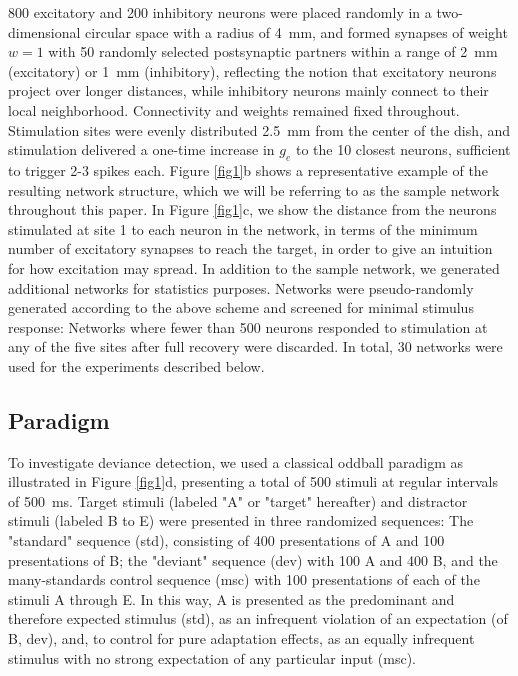 \documentclass[pdflatex,referee,iicol,sn-basic]{sn-jnl}
\theoremstyle{thmstyleone}%
\theoremstyle{thmstyletwo}%
\theoremstyle{thmstylethree}%
\begin{document}
800 excitatory and 200 inhibitory neurons were placed randomly in a two-dimensional circular space with a radius of 4~mm, and formed synapses of weight $w = 1$ with 50 randomly selected postsynaptic partners within a range of 2~mm (excitatory) or 1~mm (inhibitory), reflecting the notion that excitatory neurons project over longer distances, while inhibitory neurons mainly connect to their local neighborhood. Connectivity and weights remained fixed throughout. Stimulation sites were evenly distributed 2.5~mm from the center of the dish, and stimulation delivered a one-time increase in $g_e$ to the 10 closest neurons, sufficient to trigger 2-3 spikes each. Figure \ref{fig1}b shows a representative example of the resulting network structure, which we will be referring to as the sample network throughout this paper. In Figure \ref{fig1}c, we show the distance from the neurons stimulated at site 1 to each neuron in the network, in terms of the minimum number of excitatory synapses to reach the target, in order to give an intuition for how excitation may spread. In addition to the sample network, we generated additional networks for statistics purposes. Networks were pseudo-randomly generated according to the above scheme and screened for minimal stimulus response: Networks where fewer than 500 neurons responded to stimulation at any of the five sites after full recovery were discarded. In total, 30 networks were used for the experiments described below.

\subsection{Paradigm}\label{sec-paradigm}

To investigate deviance detection, we used a classical oddball paradigm as illustrated in Figure \ref{fig1}d, presenting a total of 500 stimuli at regular intervals of 500~ms. Target stimuli (labeled "A" or "target" hereafter) and distractor stimuli (labeled B to E) were presented in three randomized sequences: The "standard" sequence (std), consisting of 400 presentations of A and 100 presentations of B; the "deviant" sequence (dev) with 100 A and 400 B, and the many-standards control sequence (msc) with 100 presentations of each of the stimuli A through E. In this way, A is presented as the predominant and therefore expected stimulus (std), as an infrequent violation of an expectation (of B, dev), and, to control for pure adaptation effects, as an equally infrequent stimulus with no strong expectation of any particular input (msc).
\end{document}
